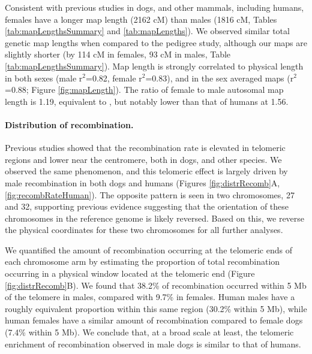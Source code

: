 Consistent with previous studies in dogs\cite{Wong2010,Mellersh1997,Neff1999}, and other mammals, including humans\cite{Coop2008,Campbell2015}, females have a longer map length (2162 cM) than males (1816 cM, Tables \ref{tab:mapLengthsSummary} and \ref{tab:mapLengths}).
We observed similar total genetic map lengths when compared to the \citet{Wong2010} pedigree study, although our maps are slightly shorter (by 114 cM in females, 93 cM in males, Table \ref{tab:mapLengthsSummary}).
Map length is strongly correlated to physical length in both sexes (male r$^2$=0.82, female r$^2$=0.83), and in the sex averaged maps (r$^2$=0.88; Figure \ref{fig:mapLength}).
The ratio of female to male autosomal map length is 1.19, equivalent to \citet{Wong2010}, but notably lower than that of humans at 1.56\cite{Campbell2015}.

\paragraph{Distribution of recombination.}
Previous studies showed that the recombination rate is elevated in telomeric regions and lower near the centromere, both in dogs\cite{Wong2010,Axelsson2012,Auton2013}, and other species\cite{DeMassy2013}.
We observed the same phenomenon, and this telomeric effect is largely driven by male recombination in both dogs and humans (Figures \ref{fig:distrRecomb}A, \ref{fig:recombRateHuman}).
The opposite pattern is seen in two chromosomes, 27 and 32, supporting previous evidence\cite{Wong2010} suggesting that the orientation of these chromosomes in the reference genome is likely reversed.
Based on this, we reverse the physical coordinates for these two chromosomes for all further analyses.

We quantified the amount of recombination occurring at the telomeric ends of each chromosome arm by estimating the proportion of total recombination occurring in a physical window located at the telomeric end (Figure \ref{fig:distrRecomb}B).
We found that 38.2\% of recombination occurred within 5 Mb of the telomere in males, compared with 9.7\% in females.
Human males have a roughly equivalent proportion within this same region (30.2\% within 5 Mb), while human females have a similar amount of recombination compared to female dogs (7.4\% within 5 Mb).
We conclude that, at a broad scale at least, the telomeric enrichment of recombination observed in male dogs is similar to that of humans.

